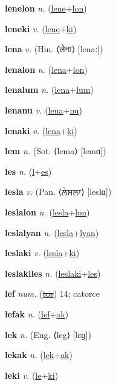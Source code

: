 \textbf{\hypertarget{lenelon}{lenelon}} \textit{n.} (\hyperlink{lene}{lene}+\allowbreak \hyperlink{lon}{lon})


\textbf{\hypertarget{leneki}{leneki}} \textit{v.} (\hyperlink{lene}{lene}+\allowbreak \hyperlink{ki}{ki})


\textbf{\hypertarget{lena}{lena}} \textit{v.} (Hin. ⟨{\devanagari{}लेना}⟩ [lenaː])


\textbf{\hypertarget{lenalon}{lenalon}} \textit{n.} (\hyperlink{lena}{lena}+\allowbreak \hyperlink{lon}{lon})


\textbf{\hypertarget{lenalum}{lenalum}} \textit{n.} (\hyperlink{lena}{lena}+\allowbreak \hyperlink{lum}{lum})


\textbf{\hypertarget{lenanu}{lenanu}} \textit{v.} (\hyperlink{lena}{lena}+\allowbreak \hyperlink{nu}{nu})


\textbf{\hypertarget{lenaki}{lenaki}} \textit{v.} (\hyperlink{lena}{lena}+\allowbreak \hyperlink{ki}{ki})


\textbf{\hypertarget{lem}{lem}} \textit{n.} (Sot. ⟨lema⟩ [lemɑ])


\textbf{\hypertarget{les}{les}} \textit{n.} (\hyperlink{l}{l}+\allowbreak \hyperlink{es}{es})


\textbf{\hypertarget{lesla}{lesla}} \textit{v.} (Pan. ⟨{\gurmukhi{}ਲੇਸਲਾ}⟩ [leslɑ])


\textbf{\hypertarget{leslalon}{leslalon}} \textit{n.} (\hyperlink{lesla}{lesla}+\allowbreak \hyperlink{lon}{lon})


\textbf{\hypertarget{leslalyan}{leslalyan}} \textit{n.} (\hyperlink{lesla}{lesla}+\allowbreak \hyperlink{lyan}{lyan})


\textbf{\hypertarget{leslaki}{leslaki}} \textit{v.} (\hyperlink{lesla}{lesla}+\allowbreak \hyperlink{ki}{ki})


\textbf{\hypertarget{leslakiles}{leslakiles}} \textit{n.} (\hyperlink{leslaki}{leslaki}+\allowbreak \hyperlink{les}{les})


\textbf{\hypertarget{lef}{lef}} \textit{num.} (\hyperlink{tos}{\sout{tos}})
14; catorce

\textbf{\hypertarget{lefak}{lefak}} \textit{n.} (\hyperlink{lef}{lef}+\allowbreak \hyperlink{ak}{ak})


\textbf{\hypertarget{lek}{lek}} \textit{n.} (Eng. ⟨leg⟩ [lɛɡ])


\textbf{\hypertarget{lekak}{lekak}} \textit{n.} (\hyperlink{lek}{lek}+\allowbreak \hyperlink{ak}{ak})


\textbf{\hypertarget{leki}{leki}} \textit{v.} (\hyperlink{le}{le}+\allowbreak \hyperlink{ki}{ki})


